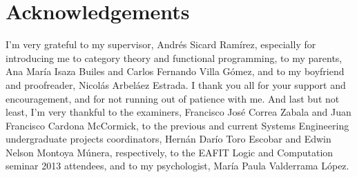 \chapter{Acknowledgements}
\label{chap:acknowledgements}

I'm very grateful to my supervisor, Andrés Sicard Ramírez, especially
for introducing me to category theory and functional programming, to
my parents, Ana María Isaza Builes and Carlos Fernando Villa Gómez,
and to my boyfriend and proofreader, Nicolás Arbeláez Estrada. I thank
you all for your support and encouragement, and for not running out of
patience with me. And last but not least, I'm very thankful to the
examiners, Francisco José Correa Zabala and Juan Francisco Cardona
McCormick, to the previous and current Systems Engineering
undergraduate projects coordinators, Hernán Darío Toro Escobar and
Edwin Nelson Montoya Múnera, respectively, to the EAFIT Logic and
Computation seminar 2013 attendees, and to my psychologist, María
Paula Valderrama López.

\clearemptydoublepage
